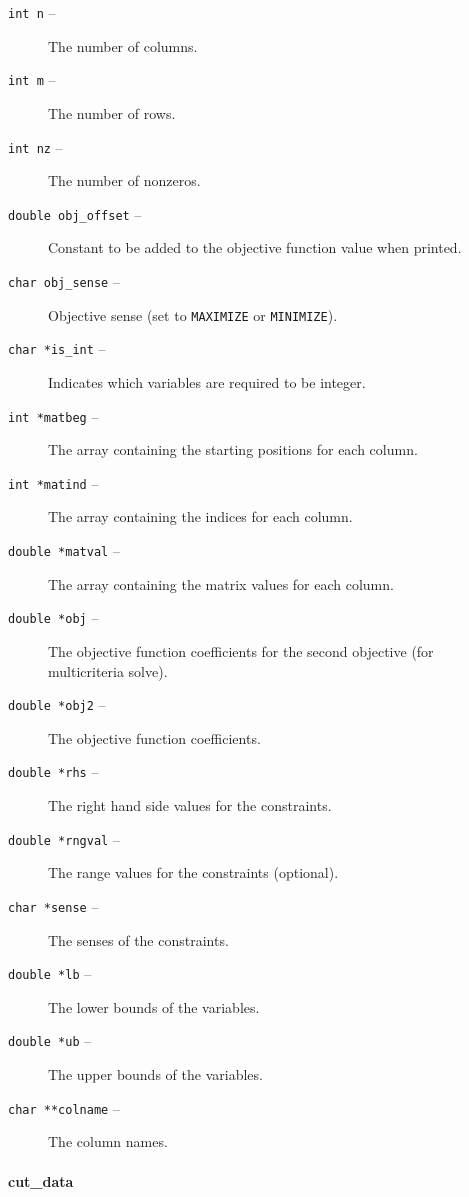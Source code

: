 \begin{description}
\begin{description}
\item [\texttt{int n} --] The number of columns.
\item [\texttt{int m} --] The number of rows.
\item [\texttt{int nz} --] The number of nonzeros.
\item [\texttt{double obj\_offset} --] Constant to be added to the objective
function value when printed.
\item [\texttt{char obj\_sense} --] Objective sense (set to \texttt{MAXIMIZE}
or \texttt{MINIMIZE}).
\item [\texttt{char *is\_int} --] Indicates which variables are required to be 
integer.
\item [\texttt{int *matbeg} -- ] The array containing the starting positions
for each column.  
\item [\texttt{int *matind} --] The array containing the indices for each
column. 
\item [\texttt{double *matval} --] The array containing the matrix values for
each column.
\item [\texttt{double *obj} --] The objective function coefficients for the second objective (for multicriteria solve).
\item [\texttt{double *obj2} --] The objective function coefficients.
\item [\texttt{double *rhs} --] The right hand side values for the
constraints. 
\item [\texttt{double *rngval} --] The range values for the constraints
(optional). 
\item [\texttt{char *sense} --] The senses of the constraints. 
\item [\texttt{double *lb} --] The lower bounds of the variables.
\item [\texttt{double *ub} --] The upper bounds of the variables.
\item [\texttt{char **colname} --] The column names.
\end{description}

\begin{htmlonly}
\paragraph{cut\_data}
\end{htmlonly}
\label{cut_data}


\end{description}
